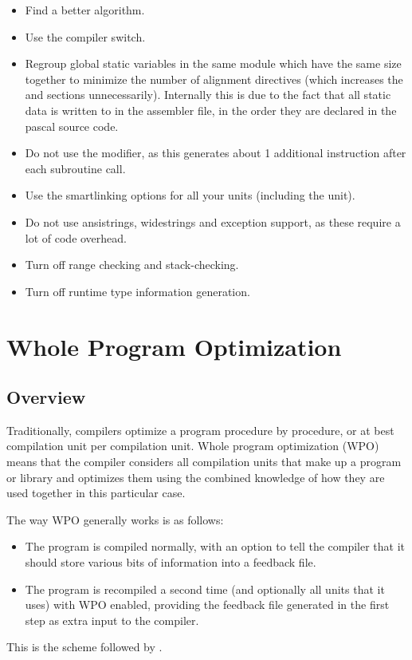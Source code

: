 \begin{itemize}

\item Find a better algorithm.

\item Use the  compiler switch.

\item Regroup global static variables in the same module which have the same
 size together to minimize the number of alignment directives (which increases
 the  and  sections unnecessarily). Internally this is
 due to the fact that all static data is written to in the assembler file,
 in the order they are declared in the pascal source code.

\item Do not use the  modifier, as this generates
about 1 additional instruction after each subroutine call.

\item Use the smartlinking options for all your units
(including the  unit).

\item Do not use ansistrings, widestrings and exception support, as these 
require a lot of code overhead.

\item Turn off range checking and stack-checking.

\item Turn off runtime type information generation.

\end{itemize}

\section{Whole Program Optimization}
\label{se:WPO}

\subsection{Overview}
Traditionally, compilers optimize a program procedure by procedure, or at
best compilation unit per compilation unit. Whole program optimization (WPO)
means that the compiler considers all compilation units that make up a
program or library and optimizes them using the combined knowledge of how
they are used together in this particular case. 

The way WPO generally works is as follows: 
\begin{itemize}
\item The program is compiled normally, with an option to tell the compiler 
that it should store various bits of information into a feedback file.
\item The program is recompiled a second time (and optionally all units 
that it uses) with WPO enabled, providing the feedback file generated in the
first step as extra input to the compiler.
\end{itemize}
This is the scheme followed by \fpc.

